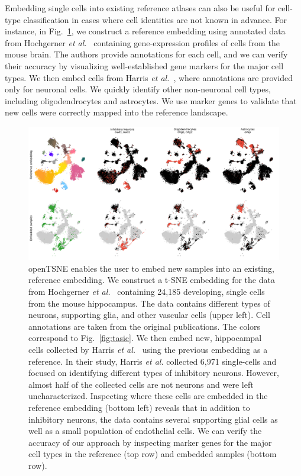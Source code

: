 \documentclass[twocolumn]{bmcart}
\begin{document}
Embedding single cells into existing reference atlases can also be useful for
cell-type classification in cases where cell identities are not known in
advance. For instance, in Fig.~\ref{fig:transform}, we construct a reference
embedding using annotated data from Hochgerner \textit{et
al.}~\cite{hochgerner2018conserved} containing gene-expression profiles of
cells from the mouse brain. The authors provide annotations for each cell, and
we can verify their accuracy by visualizing well-established gene markers for the
major cell types. We then embed cells from Harris \textit{et
al.}~\cite{harris2018classes}, where annotations are provided only for neuronal
cells. We quickly identify other non-neuronal cell types, including
oligodendrocytes and astrocytes. We use marker genes to validate that new cells
were correctly mapped into the reference landscape.

\begin{figure}[htbp]
  \includegraphics[width=\textwidth]{transform_hochgerner}
  \caption{\label{fig:transform}openTSNE enables the user to embed new samples
	into an existing, reference embedding. We construct a t-SNE embedding
	for the data from Hochgerner \textit{et
	al.}~\cite{hochgerner2018conserved} containing 24,185 developing,
	single cells from the mouse hippocampus. The data contains different
	types of neurons, supporting glia, and other vascular cells (upper
	left). Cell annotations are taken from the original publications. The
	colors correspond to Fig.~\ref{fig:tasic}. We then embed new,
	hippocampal cells collected by Harris \textit{et
	al.}~\cite{harris2018classes} using the previous embedding as a
	reference. In their study, Harris \textit{et al.} collected 6,971
	single-cells and focused on identifying different types of inhibitory
	neurons. However, almost half of the collected cells are not neurons
	and were left uncharacterized. Inspecting where these cells are
	embedded in the reference embedding (bottom left) reveals that in
	addition to inhibitory neurons, the data contains several supporting
	glial cells as well as a small population of endothelial cells. We can
	verify the accuracy of our approach by inspecting marker genes for the
	major cell types in the reference (top row) and embedded samples
	(bottom row).}
\end{figure}
\end{document}
